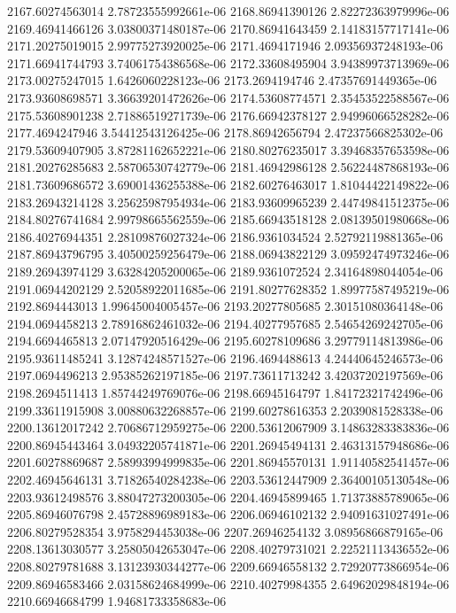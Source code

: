 {2167.60274563014 2.78723555992661e-06
2168.86941390126 2.82272363979996e-06
2169.46941466126 3.03800371480187e-06
2170.86941643459 2.14183157717141e-06
2171.20275019015 2.99775273920025e-06
2171.4694171946 2.09356937248193e-06
2171.66941744793 3.74061754386568e-06
2172.33608495904 3.94389973713969e-06
2173.00275247015 1.6426060228123e-06
2173.2694194746 2.47357691449365e-06
2173.93608698571 3.36639201472626e-06
2174.53608774571 2.35453522588567e-06
2175.53608901238 2.71886519271739e-06
2176.66942378127 2.94996066528282e-06
2177.4694247946 3.54412543126425e-06
2178.86942656794 2.47237566825302e-06
2179.53609407905 3.87281162652221e-06
2180.80276235017 3.39468357653598e-06
2181.20276285683 2.58706530742779e-06
2181.46942986128 2.56224487868193e-06
2181.73609686572 3.69001436255388e-06
2182.60276463017 1.81044422149822e-06
2183.26943214128 3.25625987954934e-06
2183.93609965239 2.44749841512375e-06
2184.80276741684 2.99798665562559e-06
2185.66943518128 2.08139501980668e-06
2186.40276944351 2.28109876027324e-06
2186.9361034524 2.52792119881365e-06
2187.86943796795 3.40500259256479e-06
2188.06943822129 3.09592474973246e-06
2189.26943974129 3.63284205200065e-06
2189.9361072524 2.34164898044054e-06
2191.06944202129 2.52058922011685e-06
2191.80277628352 1.89977587495219e-06
2192.8694443013 1.99645004005457e-06
2193.20277805685 2.30151080364148e-06
2194.0694458213 2.78916862461032e-06
2194.40277957685 2.54654269242705e-06
2194.6694465813 2.07147920516429e-06
2195.60278109686 3.29779114813986e-06
2195.93611485241 3.12874248571527e-06
2196.4694488613 4.24440645246573e-06
2197.0694496213 2.95385262197185e-06
2197.73611713242 3.42037202197569e-06
2198.2694511413 1.85744249769076e-06
2198.66945164797 1.84172321742496e-06
2199.33611915908 3.00880632268857e-06
2199.60278616353 2.2039081528338e-06
2200.13612017242 2.70686712959275e-06
2200.53612067909 3.14863283383836e-06
2200.86945443464 3.04932205741871e-06
2201.26945494131 2.46313157948686e-06
2201.60278869687 2.58993994999835e-06
2201.86945570131 1.91140582541457e-06
2202.46945646131 3.71826540284238e-06
2203.53612447909 2.36400105130548e-06
2203.93612498576 3.88047273200305e-06
2204.46945899465 1.71373885789065e-06
2205.86946076798 2.45728896989183e-06
2206.06946102132 2.94091631027491e-06
2206.80279528354 3.9758294453038e-06
2207.26946254132 3.08956866879165e-06
2208.13613030577 3.25805042653047e-06
2208.40279731021 2.22521113436552e-06
2208.80279781688 3.13123930344277e-06
2209.66946558132 2.72920773866954e-06
2209.86946583466 2.03158624684999e-06
2210.40279984355 2.64962029848194e-06
2210.66946684799 1.94681733358683e-06
}
